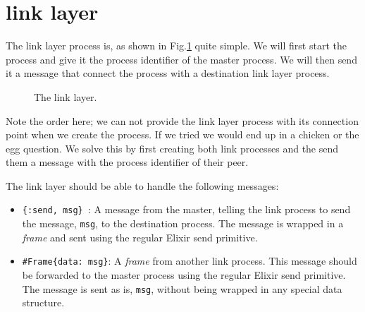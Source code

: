 \documentclass[a4paper,11pt]{article}
\begin{document}
\section{link layer}

The link layer process is, as shown in Fig.\ref{fig:link} quite
simple. We will first start the process and give it the process
identifier of the master process. We will then send it a message that
connect the process with a destination link layer process. 

\begin{figure}
\centering  
{}

\caption{The link layer.}
\label{fig:link}

\end{figure}

Note the order here; we can not provide the link layer process with
its connection point when we create the process. If we tried we would
end up in a chicken or the egg question. We solve this by first
creating both link processes and the send them a message with the process
identifier of their peer.

The link layer should be able to handle the following messages:

\begin{itemize}

  \item {\tt \{:send, msg\} }: A message from the master, telling the link
    process to send the message, {\tt msg}, to the destination process. The
    message is wrapped in a {\em frame} and sent using the
    regular Elixir send primitive.

  \item {\tt \#Frame\{data: msg\}}: A {\em frame} from another link
    process. This message should be forwarded to the master process
    using the regular Elixir send primitive. The message is sent as
    is, {\tt msg}, without being wrapped in any special data structure.
\end{itemize}
\end{document}
